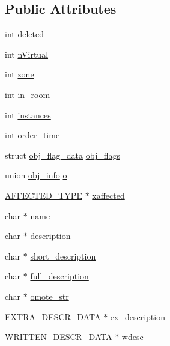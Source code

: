 \subsection*{Public Attributes}
\begin{DoxyCompactItemize}
\item 
int \hyperlink{structobj__data_ac3e759c982b48a9a005f6abbd25a5513}{deleted}
\item 
int \hyperlink{structobj__data_a0f86b2c16ca687349eac79f4e5f92180}{n\-Virtual}
\item 
int \hyperlink{structobj__data_ada72f4e7a40147ab161250ee1843a125}{zone}
\item 
int \hyperlink{structobj__data_a2424a71688fa1798153e3c0fdb535d48}{in\-\_\-room}
\item 
int \hyperlink{structobj__data_a3c0562ffffd732f1b26397de0fc4d5e9}{instances}
\item 
int \hyperlink{structobj__data_a882013eee406f79b916041750a9d3820}{order\-\_\-time}
\item 
struct \hyperlink{structobj__flag__data}{obj\-\_\-flag\-\_\-data} \hyperlink{structobj__data_a7bd3e58c91ec7bec7ee0e52f0bb911ec}{obj\-\_\-flags}
\item 
union \hyperlink{unionobj__info}{obj\-\_\-info} \hyperlink{structobj__data_ad9caadfa2dc5e579859ef20d261e673d}{o}
\item 
\hyperlink{structs_8h_a0a9304fc5764d8448c93fdffdd64e1d2}{A\-F\-F\-E\-C\-T\-E\-D\-\_\-\-T\-Y\-P\-E} $\ast$ \hyperlink{structobj__data_a4bfd45954d19b332a63708fbced73edd}{xaffected}
\item 
char $\ast$ \hyperlink{structobj__data_a8068fb72e861d43aa55a43e4e7380313}{name}
\item 
char $\ast$ \hyperlink{structobj__data_a1fd194539b4ab06132502f3d385c7384}{description}
\item 
char $\ast$ \hyperlink{structobj__data_a4d735bde7f2d4d422071b08e78581c14}{short\-\_\-description}
\item 
char $\ast$ \hyperlink{structobj__data_ae470e48b110789be6b62a3235ed5e6e3}{full\-\_\-description}
\item 
char $\ast$ \hyperlink{structobj__data_a45db6db8ab608ea8479fe23b6654e180}{omote\-\_\-str}
\item 
\hyperlink{structs_8h_a23e61a3ec169d1e601ef3325a7daa744}{E\-X\-T\-R\-A\-\_\-\-D\-E\-S\-C\-R\-\_\-\-D\-A\-T\-A} $\ast$ \hyperlink{structobj__data_aae768c61a300f56acf4153d39a6d6027}{ex\-\_\-description}
\item 
\hyperlink{structs_8h_a151eb7caf8bab08aa650efbcedb7086e}{W\-R\-I\-T\-T\-E\-N\-\_\-\-D\-E\-S\-C\-R\-\_\-\-D\-A\-T\-A} $\ast$ \hyperlink{structobj__data_ae88adcec75a80b279e174f7538f2fbb6}{wdesc}

\end{DoxyCompactItemize}
